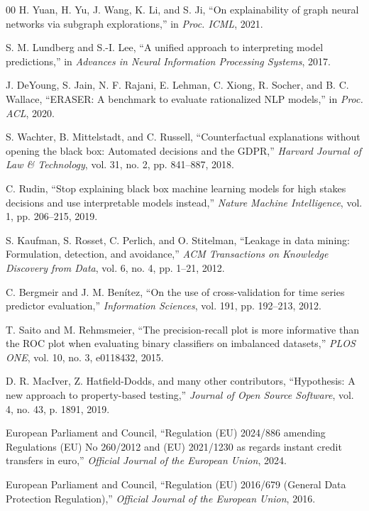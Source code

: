 \documentclass[conference]{IEEEtran}
\begin{document}
\begin{thebibliography}{00}
 H. Yuan, H. Yu, J. Wang, K. Li, and S. Ji, ``On
explainability of graph neural networks via subgraph explorations,'' in
\emph{Proc. ICML}, 2021.

 S. M. Lundberg and S.-I. Lee, ``A unified approach to
interpreting model predictions,'' in \emph{Advances in Neural Information
Processing Systems}, 2017.

 J. DeYoung, S. Jain, N. F. Rajani, E. Lehman, C.
Xiong, R. Socher, and B. C. Wallace, ``ERASER: A benchmark to evaluate
rationalized NLP models,'' in \emph{Proc. ACL}, 2020.

 S. Wachter, B. Mittelstadt, and C. Russell,
``Counterfactual explanations without opening the black box: Automated decisions
and the GDPR,'' \emph{Harvard Journal of Law \& Technology}, vol. 31, no. 2, pp.
841--887, 2018.

 C. Rudin, ``Stop explaining black box machine learning
models for high stakes decisions and use interpretable models instead,''
\emph{Nature Machine Intelligence}, vol. 1, pp. 206--215, 2019.

 S. Kaufman, S. Rosset, C. Perlich, and O. Stitelman,
``Leakage in data mining: Formulation, detection, and avoidance,'' \emph{ACM
Transactions on Knowledge Discovery from Data}, vol. 6, no. 4, pp. 1--21, 2012.

 C. Bergmeir and J. M. Ben\'{i}tez, ``On the use of
cross-validation for time series predictor evaluation,'' \emph{Information
Sciences}, vol. 191, pp. 192--213, 2012.

 T. Saito and M. Rehmsmeier, ``The precision-recall plot
is more informative than the ROC plot when evaluating binary classifiers on
imbalanced datasets,'' \emph{PLOS ONE}, vol. 10, no. 3, e0118432, 2015.

 D. R. MacIver, Z. Hatfield-Dodds, and many other
contributors, ``Hypothesis: A new approach to property-based testing,''
\emph{Journal of Open Source Software}, vol. 4, no. 43, p. 1891, 2019.

 European Parliament and Council, ``Regulation (EU) 2024/886
amending Regulations (EU) No 260/2012 and (EU) 2021/1230 as regards instant
credit transfers in euro,'' \emph{Official Journal of the European Union}, 2024.

 European Parliament and Council, ``Regulation (EU) 2016/679
(General Data Protection Regulation),'' \emph{Official Journal of the European
Union}, 2016.

\end{thebibliography}
\end{document}
